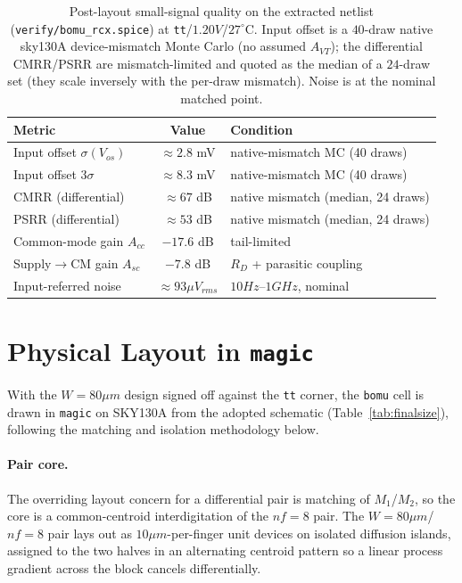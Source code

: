 \documentclass{article}
\begin{document}
\begin{table}[H]
    \centering
    \caption{Post-layout small-signal quality on the extracted netlist
             (\texttt{verify/bomu\_rcx.spice}) at \texttt{tt}/$1.20V$/$27^\circ$C.
             Input offset is a $40$-draw native sky130A device-mismatch Monte Carlo (no
             assumed $A_{VT}$); the differential CMRR/PSRR are mismatch-limited and
             quoted as the median of a $24$-draw set (they scale inversely with the
             per-draw mismatch). Noise is at the nominal matched point.}
    \label{tab:quality}
    \begin{tabular}{l|c|l} \hline
        \textbf{Metric} & \textbf{Value} & \textbf{Condition} \\ \hline
        Input offset $\sigma(V_{os})$ & $\approx2.8$ mV & native-mismatch MC (40 draws) \\ \hline
        Input offset $3\sigma$ & $\approx8.3$ mV & native-mismatch MC (40 draws) \\ \hline
        CMRR (differential) & $\approx67$ dB & native mismatch (median, 24 draws) \\ \hline
        PSRR (differential) & $\approx53$ dB & native mismatch (median, 24 draws) \\ \hline
        Common-mode gain $A_{cc}$ & $-17.6$ dB & tail-limited \\ \hline
        Supply$\rightarrow$CM gain $A_{sc}$ & $-7.8$ dB & $R_D$ + parasitic coupling \\ \hline
        Input-referred noise & $\approx93\mu V_{rms}$ & $10Hz$--$1GHz$, nominal \\ \hline
    \end{tabular}
\end{table}

\section{Physical Layout in \texttt{magic}}
\label{sec:layout}
With the $W=80\mu m$ design signed off against the \texttt{tt} corner, the
\texttt{bomu} cell is drawn in \texttt{magic} on SKY130A from the adopted schematic
(Table~\ref{tab:finalsize}), following the matching and isolation methodology below.

\paragraph{Pair core.} The overriding layout concern for a differential pair is
matching of $M_1$/$M_2$, so the core is a common-centroid interdigitation of the
$nf=8$ pair. The $W=80\mu m$/$nf=8$ pair lays out as $10\mu m$-per-finger unit
devices on isolated diffusion islands, assigned to the two halves in an alternating
centroid pattern so a linear process gradient across the block cancels differentially.
\end{document}
